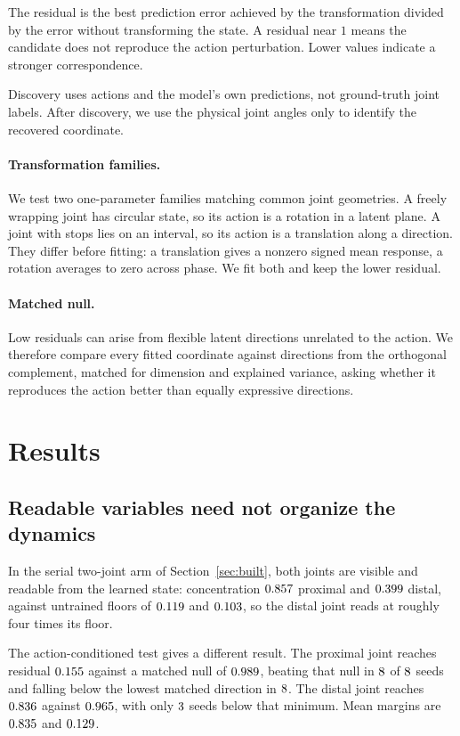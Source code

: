 \documentclass{article}
\begin{document}
The residual is the best prediction error achieved by the transformation divided by the error without transforming the state. A residual near $1$ means the candidate does not reproduce the action perturbation. Lower values indicate a stronger correspondence.

Discovery uses actions and the model's own predictions, not ground-truth joint labels. After discovery, we use the physical joint angles only to identify the recovered coordinate.

\paragraph{Transformation families.}
We test two one-parameter families matching common joint geometries. A freely wrapping joint has circular state, so its action is a rotation in a latent plane. A joint with stops lies on an interval, so its action is a translation along a direction. They differ before fitting: a translation gives a nonzero signed mean response, a rotation averages to zero across phase. We fit both and keep the lower residual.

\paragraph{Matched null.}
Low residuals can arise from flexible latent directions unrelated to the action. We therefore compare every fitted coordinate against directions from the orthogonal complement, matched for dimension and explained variance, asking whether it reproduces the action better than equally expressive directions.

\section{Results}

\subsection{Readable variables need not organize the dynamics}
\label{sec:dissoc}

In the serial two-joint arm of Section~\ref{sec:built}, both joints are visible and readable from the learned state: concentration $0.857$ proximal and $0.399$ distal, against untrained floors of $0.119$ and $0.103$, so the distal joint reads at roughly four times its floor.

The action-conditioned test gives a different result. The proximal joint reaches residual $0.155$ against a matched null of $0.989$, beating that null in $8$ of $8$ seeds and falling below the lowest matched direction in $8$. The distal joint reaches $0.836$ against $0.965$, with only $3$ seeds below that minimum. Mean margins are $0.835$ and $0.129$.
\end{document}
